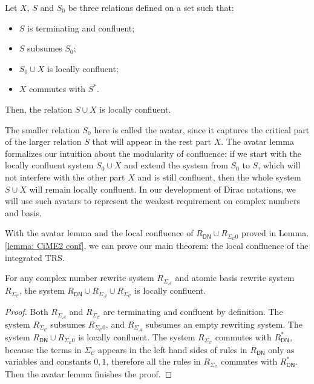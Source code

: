 \documentclass[manuscript, review, timestamp]{acmart}
\begin{document}
\begin{lemma} \cite{Arrighi2005} Let $X$, $S$ and $S_0$ be three relations defined on a set such that:
  \begin{itemize}
    \item $S$ is terminating and confluent;
    \item $S$ subsumes $S_0$;
    \item $S_0 \cup X$ is locally confluent;
    \item $X$ commutes with $S^*$.
  \end{itemize}
  Then, the relation $S \cup X$ is locally confluent.
\end{lemma}

The smaller relation $S_0$ here is called the avatar, since it captures the critical part of the larger relation $S$ that will appear in the rest part $X$. The avatar lemma formalizes our intuition about the modularity of confluence: if we start with the locally confluent system $S_0 \cup X$ and extend the system from $S_0$ to $S$, which will not interfere with the other part $X$ and is still confluent, then the whole system $S\cup X$ will remain locally confluent. In our development of Dirac notations, we will use such avatars to represent the weakest requirement on complex numbers and basis.

With the avatar lemma and the local confluence of $R_\textsf{DN} \cup R_{\Sigma_\mathcal{C}0}$ proved in Lemma.\ref{lemma: CiME2 conf}, we can prove our main theorem: the local confluence of the integrated TRS.

\begin{theorem}
  For any complex number rewrite system $R_{\Sigma_\mathcal{A}}$ and atomic basis rewrite system $R_{\Sigma_\mathcal{C}}$, the system $R_\textsf{DN} \cup R_{\Sigma_\mathcal{A}} \cup R_{\Sigma_\mathcal{C}}$ is locally confluent.
\end{theorem}
\begin{proof}
  Both $R_{\Sigma_\mathcal{A}}$ and $R_{\Sigma_\mathcal{C}}$ are terminating and confluent by definition. 
  The system $R_{\Sigma_\mathcal{C}}$ subsumes $R_{\Sigma_\mathcal{C}0}$, and $R_{\Sigma_\mathcal{A}}$ subsumes an empty rewriting system. 
  The system $R_\textsf{DN} \cup R_{\Sigma_\mathcal{C}0}$ is locally confluent. 
  The system $R_{\Sigma_\mathcal{C}}$ commutes with $R_\textsf{DN}^*$, because the terms in $\Sigma_\mathcal{C}$ appears in the left hand sides of rules in $R_\textsf{DN}$ only as variables and constants $0, 1$, therefore all the rules in $R_{\Sigma_\mathcal{C}}$ commutes with $R_\textsf{DN}^*$. 
  Then the avatar lemma finishes the proof.
\end{proof}
\end{document}
